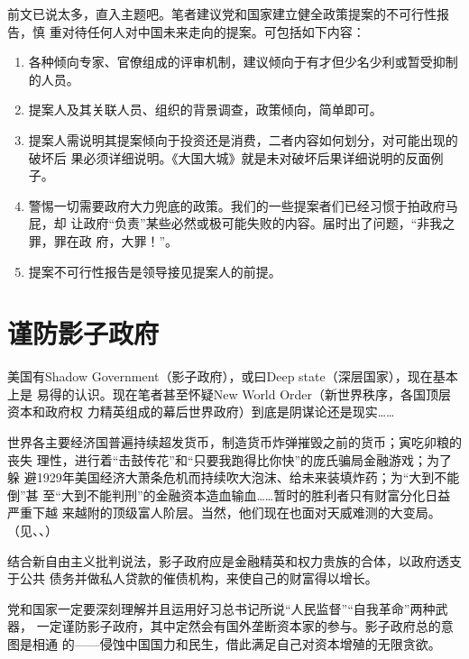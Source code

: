 前文已说太多，直入主题吧。笔者建议党和国家建立健全政策提案的不可行性报告，慎
重对待任何人对中国未来走向的提案。可包括如下内容：
\begin{enumerate}
\item 各种倾向专家、官僚组成的评审机制，建议倾向于有才但少名少利或暂受抑制的人员。

\item 提案人及其关联人员、组织的背景调查，政策倾向，简单即可。

\item 提案人需说明其提案倾向于投资还是消费，二者内容如何划分，对可能出现的破坏后
  果必须详细说明。《大国大城》就是未对破坏后果详细说明的反面例子。

\item 警惕一切需要政府大力兜底的政策。我们的一些提案者们已经习惯于拍政府马屁，却
  让政府“负责”某些必然或极可能失败的内容。届时出了问题，“非我之罪，罪在政
  府，大罪！”。

\item 提案不可行性报告是领导接见提案人的前提。
\end{enumerate}

\section{谨防影子政府}

美国有Shadow Government（影子政府），或曰Deep state（深层国家），现在基本上是
易得的认识。现在笔者甚至怀疑New World Order（新世界秩序，各国顶层资本和政府权
力精英组成的幕后世界政府）到底是阴谋论还是现实……

世界各主要经济国普遍持续超发货币，制造货币炸弹摧毁之前的货币；寅吃卯粮的丧失
理性，进行着“击鼓传花”和“只要我跑得比你快”的庞氏骗局金融游戏；为了躲
避1929年美国经济大萧条危机而持续吹大泡沫、给未来装填炸药；为“大到不能倒”甚
至“大到不能判刑”的金融资本造血输血……暂时的胜利者只有财富分化日益严重下越
来越附的顶级富人阶层。当然，他们现在也面对天威难测的大变局。（见\cite{piepenburg2022gold}、\cite{streeck2017will}、）

结合新自由主义批判说法，影子政府应是金融精英和权力贵族的合体，以政府透支于公共
债务并做私人贷款的催债机构，来使自己的财富得以增长。

党和国家一定要深刻理解并且运用好习总书记所说“人民监督”“自我革命”两种武器，
一定谨防影子政府，其中定然会有国外垄断资本家的参与。影子政府总的意图是相通
的——侵蚀中国国力和民生，借此满足自己对资本增殖的无限贪欲。



